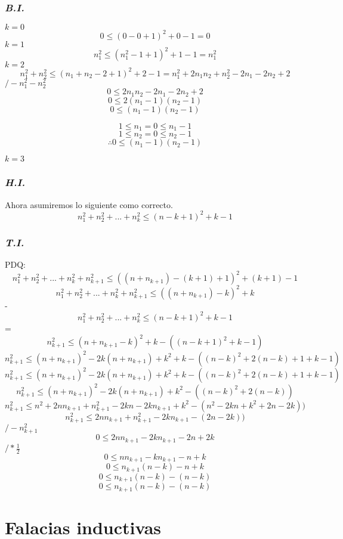 \documentclass{article}
\begin{document}
\subsubsection*{\emph{B.I.}}
$k=0$
\[0 \leq (0 - 0 +1)^2 + 0 -1 = 0\]
$k=1$
\[ n_1^2 \leq (n_1^2 - 1 + 1)^2 + 1 - 1 = n_1^2\]
$k=2$
\[ n_1^2 + n_2^2 \leq (n_1 + n_2 - 2 + 1)^2 + 2 -1 = n_1^2 + 2n_1n_2+n_2^2-2n_1-2n_2+2 \]
\hspace*{0pt}\hfill $/ - n_1^2 - n_2^2$
\[ 0 \leq  2n_1n_2-2n_1-2n_2+2 \]
\[ 0 \leq 2(n_1 - 1)(n_2 - 1) \]
\[ 0 \leq (n_1 - 1)(n_2 -1) \]

\[ 1 \leq n_1 = 0 \leq n_1 - 1  \]
\[ 1 \leq n_2 = 0 \leq n_2 -1  \]
\[ \therefore  0 \leq (n_1 - 1)(n_2 -1)\]

$k=3$
\subsubsection*{\emph{H.I.}}
Ahora asumiremos lo siguiente como correcto.
\[ n_1^2 + n_2^2 + ... + n_k^2 \leq (n-k+1)^2 + k -1\]


\subsubsection*{\emph{T.I.}}
PDQ:
\[ n_1^2 + n_2^2 + ... + n_k^2 + n_{k+1}^2 \leq ((n + n_{k+1}) - (k+1) + 1)^2 + (k+1)-1 \]
\[ n_1^2 + n_2^2 + ... + n_k^2 + n_{k+1}^2 \leq ((n + n_{k+1}) - k)^2 + k \]
-\[   n_1^2 + n_2^2 + ... + n_k^2 \leq (n-k+1)^2 + k -1\]
=\[ n_{k+1}^2 \leq (n+n_{k+1} - k)^2 + k - ((n-k+1)^2 + k -1) \]
\[ n_{k+1}^2 \leq (n+n_{k+1})^2 - 2k(n+n_{k+1}) + k^2 + k - ((n-k)^2 + 2(n-k) + 1+ k -1) \]
\[ n_{k+1}^2 \leq (n+n_{k+1})^2 - 2k(n+n_{k+1}) + k^2 + k - ((n-k)^2 + 2(n-k) + 1+ k -1) \]
\[ n_{k+1}^2 \leq (n+n_{k+1})^2 - 2k(n+n_{k+1}) + k^2 - ((n-k)^2 + 2(n-k)) \]
\[ n_{k+1}^2 \leq n^2 + 2nn_{k+1} + n_{k+1}^2 - 2kn -2kn_{k+1} + k^2  - (n^2 - 2kn +k^2 + 2n - 2k)) \]
\[ n_{k+1}^2 \leq 2nn_{k+1} + n_{k+1}^2 -2kn_{k+1} - ( 2n - 2k)) \]
\hspace*{0pt}\hfill $/ -n_{k+1}^2 $
\[ 0 \leq 2nn_{k+1} -2kn_{k+1} - 2n + 2k \]
\hspace*{0pt}\hfill $/ *\frac{1}{2} $
\[ 0 \leq nn_{k+1} -kn_{k+1} - n + k \]
\[ 0 \leq n_{k+1}(n-k) - n + k \]
\[ 0 \leq n_{k+1}(n-k) - (n - k) \]
\[ 0 \leq n_{k+1}(n-k) - (n - k) \]
\section{Falacias inductivas}
\end{document}

